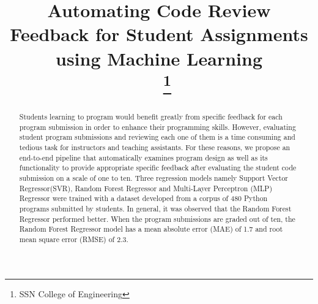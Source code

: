 \documentclass[conference]{IEEEtran}
\begin{document}
\title{Automating Code Review Feedback for Student Assignments using Machine Learning\\\
{\footnotesize}
\thanks{SSN College of Engineering}
}

\author{
\and
{}
\and
{}
\and
{}
}

\maketitle

\begin{abstract}

Students learning to program would benefit greatly from
    specific feedback for each program submission in order to
    enhance their programming skills. However, evaluating
    student program submissions and reviewing each one of
    them is a time consuming and tedious task for instructors
    and teaching assistants. For these reasons, we propose an
    end-to-end pipeline that automatically examines program
    design as well as its functionality to provide
    appropriate specific feedback after evaluating the
    student code submission on a scale of one to ten. Three
    regression models namely Support Vector Regressor(SVR), Random
    Forest Regressor and Multi-Layer Perceptron (MLP) Regressor
    were trained with a dataset developed from a corpus of
    480 Python programs submitted by students. In general, it
    was observed that the Random Forest Regressor performed
    better. When the program submissions are graded out of
    ten, the Random Forest Regressor model has a mean
    absolute error (MAE) of 1.7 and root mean square error
    (RMSE) of 2.3.

\end{abstract}
\end{document}
